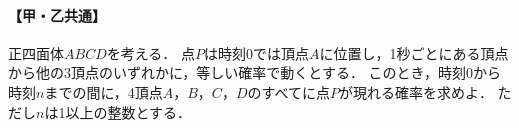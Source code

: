 \documentclass[../../main.tex]{subfiles}
\begin{document}
\paragraph{【甲・乙共通】}
正四面体$ABCD$を考える．
点$P$は時刻0では頂点$A$に位置し，1秒ごとにある頂点から他の3頂点のいずれかに，等しい確率で動くとする．
このとき，時刻0から時刻$n$までの間に，4頂点$A$，$B$，$C$，$D$のすべてに点$P$が現れる確率を求めよ．
ただし$n$は1以上の整数とする．
\end{document}
